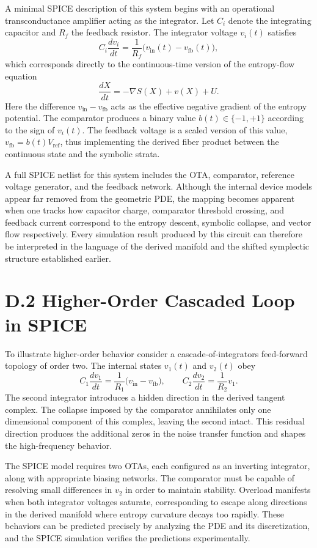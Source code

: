 A minimal SPICE description of this system begins with an operational transconductance amplifier acting as the integrator. Let \(C_{i}\) denote the integrating capacitor and \(R_{f}\) the feedback resistor. The integrator voltage \(v_{i}(t)\) satisfies
\[
C_{i}\frac{dv_{i}}{dt} = \frac{1}{R_{f}}\bigl(v_{\mathrm{in}}(t) - v_{\mathrm{fb}}(t)\bigr),
\]
which corresponds directly to the continuous-time version of the entropy-flow equation
\[
\frac{dX}{dt} = -\nabla S(X) + v(X) + U.
\]
Here the difference \(v_{\mathrm{in}} - v_{\mathrm{fb}}\) acts as the effective negative gradient of the entropy potential. The comparator produces a binary value \(b(t)\in\{-1,+1\}\) according to the sign of \(v_{i}(t)\). The feedback voltage is a scaled version of this value, \(v_{\mathrm{fb}} = b(t) V_{\mathrm{ref}}\), thus implementing the derived fiber product between the continuous state and the symbolic strata.

A full SPICE netlist for this system includes the OTA, comparator, reference voltage generator, and the feedback network. Although the internal device models appear far removed from the geometric PDE, the mapping becomes apparent when one tracks how capacitor charge, comparator threshold crossing, and feedback current correspond to the entropy descent, symbolic collapse, and vector flow respectively. Every simulation result produced by this circuit can therefore be interpreted in the language of the derived manifold and the shifted symplectic structure established earlier.

\section{D.2 Higher-Order Cascaded Loop in SPICE}

To illustrate higher-order behavior consider a cascade-of-integrators feed-forward topology of order two. The internal states \(v_{1}(t)\) and \(v_{2}(t)\) obey
\[
C_{1}\frac{dv_{1}}{dt} = \frac{1}{R_{1}}\bigl(v_{\mathrm{in}} - v_{\mathrm{fb}}\bigr),
\qquad
C_{2}\frac{dv_{2}}{dt} = \frac{1}{R_{2}}v_{1}.
\]
The second integrator introduces a hidden direction in the derived tangent complex. The collapse imposed by the comparator annihilates only one dimensional component of this complex, leaving the second intact. This residual direction produces the additional zeros in the noise transfer function and shapes the high-frequency behavior.

The SPICE model requires two OTAs, each configured as an inverting integrator, along with appropriate biasing networks. The comparator must be capable of resolving small differences in \(v_{2}\) in order to maintain stability. Overload manifests when both integrator voltages saturate, corresponding to escape along directions in the derived manifold where entropy curvature decays too rapidly. These behaviors can be predicted precisely by analyzing the PDE and its discretization, and the SPICE simulation verifies the predictions experimentally.

